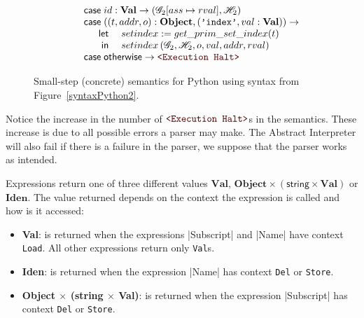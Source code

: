 \begin{figure}
\[\begin{array}[t]{l}
    \qquad \casem{id: \mathbf{Val}} \to \left(\Glo_2[ass \mapsto rval], \Hea_2\right) \\
    \qquad \casem{((t, addr, o): \mathbf{Object}, (\texttt{'index'}, val: \mathbf{Val}))} \to \\
    \qquad\quad\begin{array}[t]{rl}
            \letm& setindex := get\_prim\_set\_index(t) \\
             \inm& setindex\left(\Glo_2, \Hea_2, o, val, addr, rval\right) \\
    \end{array} \\
    \qquad \casem{\textsf{otherwise}} \to \Halt \\
  \end{array}\]
\caption{Small-step (concrete) semantics for Python using syntax from
  Figure~\ref{syntaxPython2}.\label{smallstep2}}
\end{figure}

Notice the increase in the number of \(\Halt\)s in the semantics. These increase is due to
all possible errors a parser may make. The Abstract Interpreter will also fail if there
is a failure in the parser, we suppose that the parser works as intended.

Expressions return one of three different values
\(\mathbf{Val}\), \(\mathbf{Object} \times (\textsf{string} \times \mathbf{Val})\) or
\(\mathbf{Iden}\). The value returned depends on the context the expression is called and
how is it accessed:

\begin{itemize}
\tightlist
\item \textbf{Val}: is returned when the expressions \pycode|Subscript| and \pycode|Name|
  have context \verb|Load|. All other expressions return only \verb|Val|s.
\item \textbf{Iden}: is returned when the expression \pycode|Name| has context \verb|Del|
  or \verb|Store|.
\item \textbf{Object $\times$ (string $\times$ Val)}: is returned when the expression \pycode|Subscript|
  has context \verb|Del| or \verb|Store|.
\end{itemize}

%


